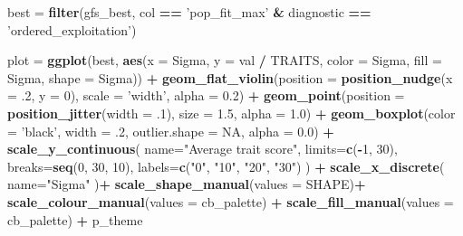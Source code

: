\documentclass[]{book}
\newenvironment{Shaded}{\begin{snugshade}}{\end{snugshade}}
\newcommand{\DataTypeTok}[1]{\textcolor[rgb]{0.13,0.29,0.53}{#1}}
\newcommand{\DecValTok}[1]{\textcolor[rgb]{0.00,0.00,0.81}{#1}}
\newcommand{\FloatTok}[1]{\textcolor[rgb]{0.00,0.00,0.81}{#1}}
\newcommand{\KeywordTok}[1]{\textcolor[rgb]{0.13,0.29,0.53}{\textbf{#1}}}
\newcommand{\NormalTok}[1]{#1}
\newcommand{\OperatorTok}[1]{\textcolor[rgb]{0.81,0.36,0.00}{\textbf{#1}}}
\newcommand{\OtherTok}[1]{\textcolor[rgb]{0.56,0.35,0.01}{#1}}
\newcommand{\StringTok}[1]{\textcolor[rgb]{0.31,0.60,0.02}{#1}}
\begin{document}
\begin{Shaded}
\begin{Highlighting}[]
\NormalTok{best =}\StringTok{ }\KeywordTok{filter}\NormalTok{(gfs_best, col }\OperatorTok{==}\StringTok{ 'pop_fit_max'} \OperatorTok{&}\StringTok{ }\NormalTok{diagnostic }\OperatorTok{==}\StringTok{ 'ordered_exploitation'}\NormalTok{)}

\NormalTok{plot =}\StringTok{ }\KeywordTok{ggplot}\NormalTok{(best, }\KeywordTok{aes}\NormalTok{(}\DataTypeTok{x =}\NormalTok{ Sigma, }\DataTypeTok{y =}\NormalTok{ val }\OperatorTok{/}\StringTok{ }\NormalTok{TRAITS, }\DataTypeTok{color =}\NormalTok{ Sigma, }\DataTypeTok{fill =}\NormalTok{ Sigma, }\DataTypeTok{shape =}\NormalTok{ Sigma)) }\OperatorTok{+}
\StringTok{  }\KeywordTok{geom_flat_violin}\NormalTok{(}\DataTypeTok{position =} \KeywordTok{position_nudge}\NormalTok{(}\DataTypeTok{x =} \FloatTok{.2}\NormalTok{, }\DataTypeTok{y =} \DecValTok{0}\NormalTok{), }\DataTypeTok{scale =} \StringTok{'width'}\NormalTok{, }\DataTypeTok{alpha =} \FloatTok{0.2}\NormalTok{) }\OperatorTok{+}
\StringTok{  }\KeywordTok{geom_point}\NormalTok{(}\DataTypeTok{position =} \KeywordTok{position_jitter}\NormalTok{(}\DataTypeTok{width =} \FloatTok{.1}\NormalTok{), }\DataTypeTok{size =} \FloatTok{1.5}\NormalTok{, }\DataTypeTok{alpha =} \FloatTok{1.0}\NormalTok{) }\OperatorTok{+}
\StringTok{  }\KeywordTok{geom_boxplot}\NormalTok{(}\DataTypeTok{color =} \StringTok{'black'}\NormalTok{, }\DataTypeTok{width =} \FloatTok{.2}\NormalTok{, }\DataTypeTok{outlier.shape =} \OtherTok{NA}\NormalTok{, }\DataTypeTok{alpha =} \FloatTok{0.0}\NormalTok{) }\OperatorTok{+}
\StringTok{  }\KeywordTok{scale_y_continuous}\NormalTok{(}
    \DataTypeTok{name=}\StringTok{"Average trait score"}\NormalTok{,}
    \DataTypeTok{limits=}\KeywordTok{c}\NormalTok{(}\OperatorTok{-}\DecValTok{1}\NormalTok{, }\DecValTok{30}\NormalTok{),}
    \DataTypeTok{breaks=}\KeywordTok{seq}\NormalTok{(}\DecValTok{0}\NormalTok{, }\DecValTok{30}\NormalTok{, }\DecValTok{10}\NormalTok{),}
    \DataTypeTok{labels=}\KeywordTok{c}\NormalTok{(}\StringTok{"0"}\NormalTok{, }\StringTok{"10"}\NormalTok{, }\StringTok{"20"}\NormalTok{, }\StringTok{"30"}\NormalTok{)}
\NormalTok{  ) }\OperatorTok{+}
\StringTok{  }\KeywordTok{scale_x_discrete}\NormalTok{(}
    \DataTypeTok{name=}\StringTok{"Sigma"}
\NormalTok{  )}\OperatorTok{+}
\StringTok{  }\KeywordTok{scale_shape_manual}\NormalTok{(}\DataTypeTok{values =}\NormalTok{ SHAPE)}\OperatorTok{+}
\StringTok{  }\KeywordTok{scale_colour_manual}\NormalTok{(}\DataTypeTok{values =}\NormalTok{ cb_palette) }\OperatorTok{+}
\StringTok{  }\KeywordTok{scale_fill_manual}\NormalTok{(}\DataTypeTok{values =}\NormalTok{ cb_palette) }\OperatorTok{+}
\StringTok{  }\NormalTok{p_theme}


\end{Highlighting}
\end{Shaded}
\end{document}
